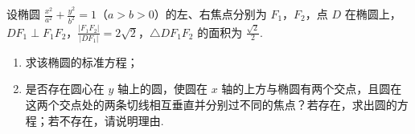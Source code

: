 \begin{problem}
设椭圆 \(\frac{x^2}{a^2} + \frac{y^2}{b^2} = 1\)（\(a > b > 0\)）的左、右焦点分别为 \(F_1\)，\(F_2\)，点 \(D\) 在椭圆上，\(DF_1 \perp F_1F_2\)，\(\frac{|F_1F_2|}{|DF_1|} = 2\sqrt{2}\)，\(\triangle DF_1F_2\) 的面积为 \(\frac{\sqrt{2}}{2}\).

\begin{enumerate}
\item 求该椭圆的标准方程；
\item 是否存在圆心在 \(y\) 轴上的圆，使圆在 \(x\) 轴的上方与椭圆有两个交点，且圆在这两个交点处的两条切线相互垂直并分别过不同的焦点？若存在，求出圆的方程；若不存在，请说明理由.
\end{enumerate}

\end{problem}

